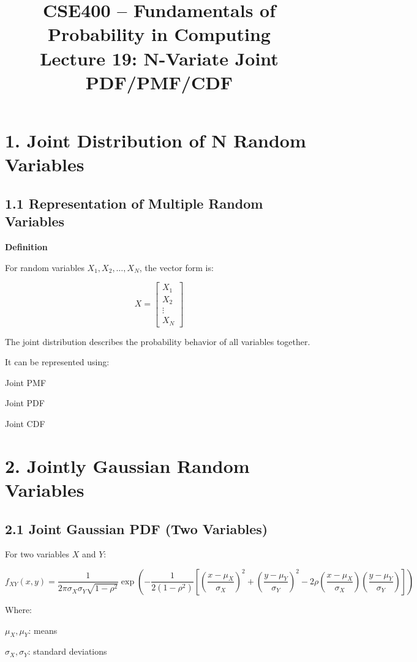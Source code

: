 \documentclass[12pt]{article}
\title{CSE400 – Fundamentals of Probability in Computing\\
Lecture 19: N-Variate Joint PDF/PMF/CDF}
\date{}
\begin{document}
\maketitle

\section*{1. Joint Distribution of N Random Variables}

\subsection*{1.1 Representation of Multiple Random Variables}

\textbf{Definition}

For random variables $X_1, X_2, \dots, X_N$, the vector form is:

\[
X =
\begin{bmatrix}
X_1 \\
X_2 \\
\vdots \\
X_N
\end{bmatrix}
\]

The joint distribution describes the probability behavior of all variables together.

It can be represented using:

Joint PMF

Joint PDF

Joint CDF

\section*{2. Jointly Gaussian Random Variables}

\subsection*{2.1 Joint Gaussian PDF (Two Variables)}

For two variables $X$ and $Y$:

\[
f_{XY}(x,y)=
\frac{1}{2\pi\sigma_X\sigma_Y\sqrt{1-\rho^2}}
\exp\left(
-\frac{1}{2(1-\rho^2)}
\left[
\left(\frac{x-\mu_X}{\sigma_X}\right)^2
+
\left(\frac{y-\mu_Y}{\sigma_Y}\right)^2
-2\rho
\left(\frac{x-\mu_X}{\sigma_X}\right)
\left(\frac{y-\mu_Y}{\sigma_Y}\right)
\right]
\right)
\]

Where:

$\mu_X,\mu_Y$: means

$\sigma_X,\sigma_Y$: standard deviations
\end{document}
